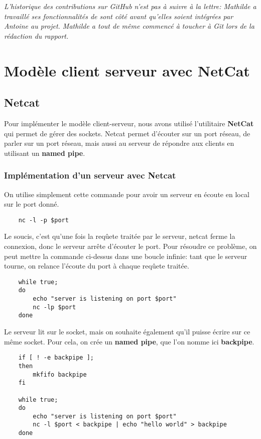 \documentclass[titlepage]{article}
\begin{document}
	\textit{L'historique des contributions sur GitHub n'est pas à suivre à la lettre: Mathilde a travaillé ses fonctionnalités de sont côté avant qu'elles soient intégrées par Antoine au projet. Mathilde a tout de même commencé à toucher à Git lors de la rédaction du rapport.}

	\section{Modèle client serveur avec NetCat}
	
	\subsection{Netcat} 
	Pour implémenter le modèle client-serveur, nous avons utilisé l'utilitaire \textbf{NetCat} qui permet de gérer des sockets.
	Netcat permet d'écouter sur un port réseau, de parler sur un port réseau, mais aussi au serveur de répondre aux clients en utilisant un \textbf{named pipe}.

	\subsubsection{Implémentation d'un serveur avec Netcat}

	On utilise simplement cette commande pour avoir un serveur en écoute en local sur le port donné.
	\begin{lstlisting}
	nc -l -p $port
	\end{lstlisting}

	Le soucis, c'est qu'une fois la reqûete traitée par le serveur, netcat ferme la connexion, donc le serveur arrête d'écouter le port. Pour résoudre ce problème, on peut mettre la commande ci-dessus dans une boucle infinie: tant que le serveur tourne, on relance l'écoute du port à chaque reqûete traitée.
	\begin{lstlisting}
	while true;
	do
		echo "server is listening on port $port"
		nc -lp $port
	done
	\end{lstlisting}

	Le serveur lit sur le socket, mais on souhaite également qu'il puisse écrire sur ce même socket. Pour cela, on crée un \textbf{named pipe}, que l'on nomme ici \textbf{backpipe}.
	\begin{lstlisting}
	if [ ! -e backpipe ];
	then
	    mkfifo backpipe
	fi

	while true;
	do
	    echo "server is listening on port $port"
	    nc -l $port < backpipe | echo "hello world" > backpipe
	done
	\end{lstlisting}
\end{document}
